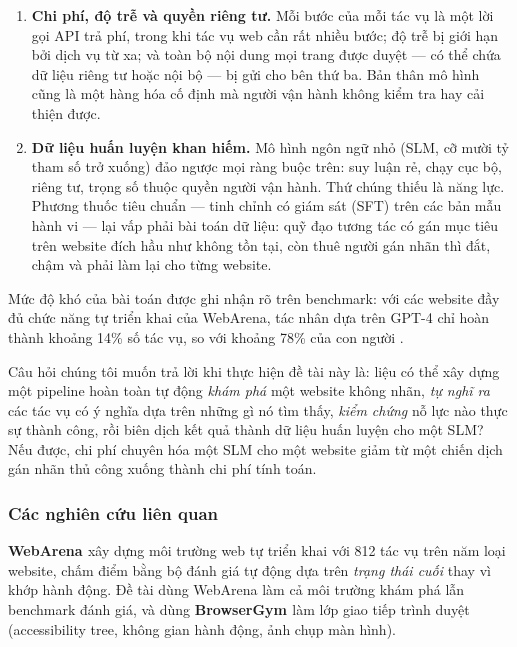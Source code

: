 \documentclass[14pt]{article}
\begin{document}
\begin{enumerate}[label=(\arabic*)]
    \item \textbf{Chi phí, độ trễ và quyền riêng tư.} Mỗi bước của mỗi tác vụ là một lời gọi API trả phí, trong khi tác vụ web cần rất nhiều bước; độ trễ bị giới hạn bởi dịch vụ từ xa; và toàn bộ nội dung mọi trang được duyệt --- có thể chứa dữ liệu riêng tư hoặc nội bộ --- bị gửi cho bên thứ ba. Bản thân mô hình cũng là một hàng hóa cố định mà người vận hành không kiểm tra hay cải thiện được.

    \item \textbf{Dữ liệu huấn luyện khan hiếm.} Mô hình ngôn ngữ nhỏ (SLM, cỡ mười tỷ tham số trở xuống) đảo ngược mọi ràng buộc trên: suy luận rẻ, chạy cục bộ, riêng tư, trọng số thuộc quyền người vận hành. Thứ chúng thiếu là năng lực. Phương thuốc tiêu chuẩn --- tinh chỉnh có giám sát (SFT) trên các bản mẫu hành vi --- lại vấp phải bài toán dữ liệu: quỹ đạo tương tác có gán mục tiêu trên website đích hầu như không tồn tại, còn thuê người gán nhãn thì đắt, chậm và phải làm lại cho từng website.
\end{enumerate}

Mức độ khó của bài toán được ghi nhận rõ trên benchmark: với các website đầy đủ chức năng tự triển khai của WebArena, tác nhân dựa trên GPT-4 chỉ hoàn thành khoảng 14\% số tác vụ, so với khoảng 78\% của con người \cite{zhou2024webarena}.

Câu hỏi chúng tôi muốn trả lời khi thực hiện đề tài này là: liệu có thể xây dựng một pipeline hoàn toàn tự động \textit{khám phá} một website không nhãn, \textit{tự nghĩ ra} các tác vụ có ý nghĩa dựa trên những gì nó tìm thấy, \textit{kiểm chứng} nỗ lực nào thực sự thành công, rồi biên dịch kết quả thành dữ liệu huấn luyện cho một SLM? Nếu được, chi phí chuyên hóa một SLM cho một website giảm từ một chiến dịch gán nhãn thủ công xuống thành chi phí tính toán.

\subsubsection{Các nghiên cứu liên quan}

\textbf{WebArena \cite{zhou2024webarena}} xây dựng môi trường web tự triển khai với 812 tác vụ trên năm loại website, chấm điểm bằng bộ đánh giá tự động dựa trên \textit{trạng thái cuối} thay vì khớp hành động. Đề tài dùng WebArena làm cả môi trường khám phá lẫn benchmark đánh giá, và dùng \textbf{BrowserGym \cite{dechezelles2025browsergym}} làm lớp giao tiếp trình duyệt (accessibility tree, không gian hành động, ảnh chụp màn hình).
\end{document}
